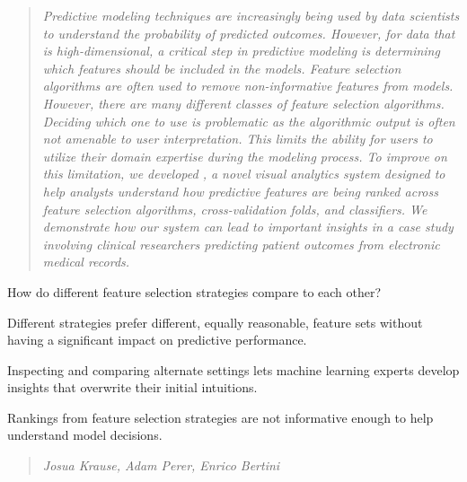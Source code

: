 \begin{quote}
\textit{Predictive modeling techniques are increasingly being used by
data scientists to understand the probability of predicted outcomes.
However, for data that is high-dimensional, a critical step in predictive
modeling is determining which features should be included in the models.
Feature selection algorithms are often used to
remove non-informative features from models.
However, there are many different classes of feature selection algorithms.
Deciding which one to use is problematic as the algorithmic output
is often not amenable to user interpretation.
This limits the ability for users to utilize their
domain expertise during the modeling process.
To improve on this limitation, we developed \infuse ,
a novel visual analytics system designed to help analysts
understand how predictive features are being ranked across
feature selection algorithms, cross-validation folds, and classifiers.
We demonstrate how our system can lead to important insights
in a case study involving clinical researchers predicting patient
outcomes from electronic medical records.
}\end{quote}

\begin{contributions}{How do different feature selection strategies compare to each other?}
\item Different strategies prefer different, equally reasonable, feature sets without having a significant impact on predictive performance.
\item Inspecting and comparing alternate settings lets machine learning experts develop insights that overwrite their initial intuitions.
\item Rankings from feature selection strategies are not informative enough to help understand model decisions.
\end{contributions}

\begin{quote}
\textit{Josua Krause, Adam Perer, Enrico Bertini}
\end{quote}